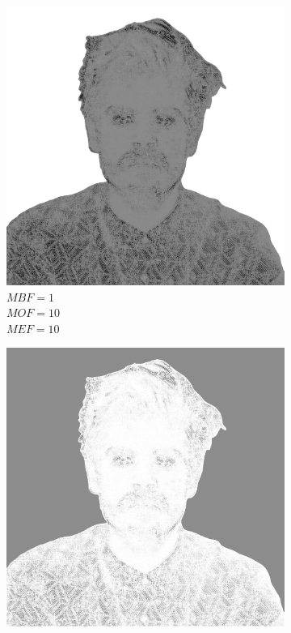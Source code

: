 \begin{figure}[H]
\begin{subfigure}{0.32\textwidth}
        \includegraphics[width = \textwidth]{img/4-mine/taco-mask/taco_mask_c20_inv0_bg1_obj10_ed10.png}
        \caption{\(MBF = 1\) \\ \(MOF = 10\) \\ \(MEF = 10\)}
        \label{mine-param-taco-g}
    \end{subfigure}
    \begin{subfigure}{0.32\textwidth}
        \centering
        \includegraphics[width = \textwidth]{img/4-mine/taco-mask/taco_mask_c20_inv0_bg10_obj1_ed10.png}

\end{subfigure}
\end{figure}
